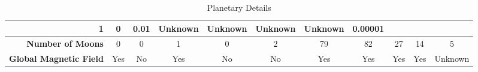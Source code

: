 \begin{landscape}
\begin{table}[H]
\begin{tabular}{|r|c|c|c|c|c|c|c|c|c|c|}
  \cellcolor[HTML]{F5F5F5}1 &
  \cellcolor[HTML]{FFFFFF}0 &
  \cellcolor[HTML]{F5F5F5}0.01 &
  \cellcolor[HTML]{FFFFFF}Unknown &
  \cellcolor[HTML]{F5F5F5}Unknown &
  \cellcolor[HTML]{FFFFFF}Unknown &
  \cellcolor[HTML]{F5F5F5}Unknown &
  \cellcolor[HTML]{FFFFFF}0.00001 \\ \hline
\textbf{Number of Moons} &
  \cellcolor[HTML]{F5F5F5}0 &
  \cellcolor[HTML]{FFFFFF}0 &
  \cellcolor[HTML]{F5F5F5}1 &
  \cellcolor[HTML]{FFFFFF}0 &
  \cellcolor[HTML]{F5F5F5}2 &
  \cellcolor[HTML]{FFFFFF}79 &
  \cellcolor[HTML]{F5F5F5}82 &
  \cellcolor[HTML]{FFFFFF}27 &
  \cellcolor[HTML]{F5F5F5}14 &
  \cellcolor[HTML]{FFFFFF}5 \\ \hline
\textbf{Global Magnetic Field} &
  \cellcolor[HTML]{F5F5F5}Yes &
  \cellcolor[HTML]{FFFFFF}No &
  \cellcolor[HTML]{F5F5F5}Yes &
  \cellcolor[HTML]{FFFFFF}No &
  \cellcolor[HTML]{F5F5F5}No &
  \cellcolor[HTML]{FFFFFF}Yes &
  \cellcolor[HTML]{F5F5F5}Yes &
  \cellcolor[HTML]{FFFFFF}Yes &
  \cellcolor[HTML]{F5F5F5}Yes &
  \cellcolor[HTML]{FFFFFF}Unknown \\ \hline
\end{tabular}
\caption{Planetary Details}
\label{tab:db}
\end{table}
\end{landscape}